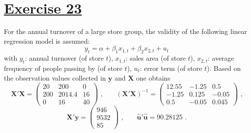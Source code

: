 \documentclass[captions=tableheading, 12pt, headings=small, parskip=half]{scrartcl}
\begin{document}
\section*{\underline{Exercise 23}}
For the annual turnover of a large store group, the validity of the following linear regression model is assumed:
\[
y_t = \alpha + \beta_1x_{1,t} + \beta_2x_{2,t} + u_t
\]with $y_t$: annual turnover (of store $t$), $x_{1,t}$: sales area (of store $t$), $x_{2,t}$: average frequency of people passing by (of store $t$), $u_t$: error term (of store $t$). Based on the observation values collected in $\boldsymbol{y}$ and $\boldsymbol{X}$ one obtains
\[
\boldsymbol{X}'\boldsymbol{X} =
\begin{pmatrix}
20 & 200 & 0 \\
200 & 2014.4 & 16 \\
0 & 16 & 40
\end{pmatrix} \text{ ,}\qquad
(\boldsymbol{X}'\boldsymbol{X})^{-1} = 
\begin{pmatrix}
12.55 & -1.25 & 0.5 \\
-1.25 & 0.125 & -0.05 \\
0.5 & -0.05 & 0.045
\end{pmatrix}\text{ ,}
\]
\[
\boldsymbol{X}'\boldsymbol{y} = \begin{pmatrix} 946\\9532\\85 \end{pmatrix}\text{ ,} \qquad
\boldsymbol{\hat{u}}'\boldsymbol{\hat{u}} = 90.28125\text{ .}
\]
\end{document}
